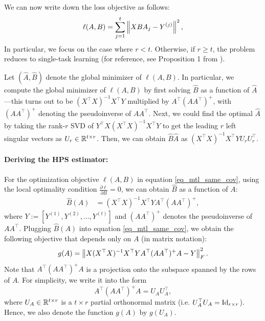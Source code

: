 We can now write down the loss objective as follows:
\begin{align}
	\ell(A, B) = \sum_{j=1}^t \left\| X B A_j - Y^{(j)} \right\|^2, \label{eq_mtl_same_cov}
\end{align}
In particular, we focus on the case where $r < t$. Otherwise, if $r \ge t$, the problem reduces to single-task learning (for reference, see Proposition 1 from \citep{wu2020understanding}).

Let $(\hat A, \hat B)$ denote the global minimizer of $\ell(A, B)$.
{In particular, we compute the global minimizer of $\ell(A, B)$ by first solving $\hat B$ as a function of $\hat A$---this turns out to be $(X^{\top}X)^{-1} X^{\top}Y$ multiplied by  $A^{\top} (A A^{\top})^+$, with $(AA^{\top})^{+}$ denoting the pseudoinverse of $AA^{\top}$. 
Next, we could find the optimal $\hat A$ by taking the rank-$r$ SVD of $Y^{\top} X (X^{\top}X)^{-1} X^{\top}Y$ to get the leading $r$ left singular vectors as $U_r \in\mathbb{R}^{t\times r}$.
Then, we can obtain $\hat B \hat A$ as $(X^{\top} X)^{-1} X^{\top} Y U_r U_r^{\top}$.}


\paragraph{Deriving the HPS estimator:} For the optimization objective $\ell(A, B)$ in equation \eqref{eq_mtl_same_cov}, using the local optimality condition $\frac {\partial \ell} {\partial B} = 0$, we can obtain $\hat{B}$ as a function of $A$:
\begin{align}
    \hat{B}(A) %
    &= (X^{\top} X)^{-1} X^{\top} Y A^{\top} (AA^{\top})^{+}, \label{eq_Bhat}
\end{align}
where $Y := [Y^{(1)}, Y^{(2)}, \dots, Y^{(t)}]$ and $(AA^{\top})^{+}$ denotes the pseudoinverse of $AA^{\top}$.
Plugging $\hat{B}(A)$ into equation \eqref{eq_mtl_same_cov}, we obtain the following objective that depends only on $A$ (in matrix notation):
\begin{align}\label{eq_mtl_output_layer}
    g(A) = \left\| X (X^{\top}X)^{-1}X^{\top} Y A^{\top} (AA^{\top})^{+} A - Y \right\|_{F}^2.
\end{align}
Note that $A^{\top} (AA^{\top})^{+} A$ is a projection onto the subspace spanned by the rows of $A$. For simplicity, we write it into the form
	$$A^{\top} (AA^{\top})^{+} A= U_A U_A^\top,$$
where $U_A \in \mathbb{R}^{t\times r}$ is a $t\times r$ partial orthonormal matrix (i.e. $U_A^\top U_A=\operatorname{Id}_{r\times r}$). Hence, we also denote the function $g(A)$ by $g(U_A)$.

